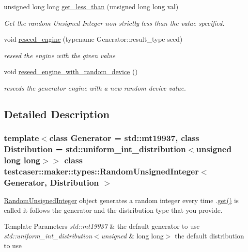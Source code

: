 \begin{DoxyCompactItemize}
unsigned long long \mbox{\hyperlink{classtestcaser_1_1maker_1_1types_1_1RandomUnsignedInteger_aa13e775f49786618884633ce67aa5d32}{get\+\_\+less\+\_\+than}} (unsigned long long val)
\begin{DoxyCompactList}\small\item\em Get the random Unsigned Integer non-\/strictly less than the value specified. \end{DoxyCompactList}\item 
void \mbox{\hyperlink{classtestcaser_1_1maker_1_1types_1_1RandomUnsignedInteger_ac0ec747e5fe2701bd3533866e97ffcf7}{reseed\+\_\+engine}} (typename Generator\+::result\+\_\+type seed)
\begin{DoxyCompactList}\small\item\em reseed the engine with the given value \end{DoxyCompactList}\item 
void \mbox{\hyperlink{classtestcaser_1_1maker_1_1types_1_1RandomUnsignedInteger_acd7ff23154cf792b11d8344d091100fe}{reseed\+\_\+engine\+\_\+with\+\_\+random\+\_\+device}} ()
\begin{DoxyCompactList}\small\item\em reseeds the generator engine with a new random device value. \end{DoxyCompactList}\end{DoxyCompactItemize}


\subsection{Detailed Description}
\subsubsection*{template$<$class Generator = std\+::mt19937, class Distribution = std\+::uniform\+\_\+int\+\_\+distribution$<$unsigned long long$>$$>$\newline
class testcaser\+::maker\+::types\+::\+Random\+Unsigned\+Integer$<$ Generator, Distribution $>$}

\mbox{\hyperlink{classtestcaser_1_1maker_1_1types_1_1RandomUnsignedInteger}{Random\+Unsigned\+Integer}} object generates a random integer every time .\mbox{\hyperlink{classtestcaser_1_1maker_1_1types_1_1RandomUnsignedInteger_a73504939f740445d56b0bd00257f5480}{get()}} is called it follows the generator and the distribution type that you provide. 


\begin{DoxyTemplParams}{Template Parameters}
{\em std\+::mt19937} & the default generator to use \\
\hline
{\em std\+::uniform\+\_\+int\+\_\+distribution$<$unsigned} & long long$>$ the default distribution to use \\
\hline
\end{DoxyTemplParams}


